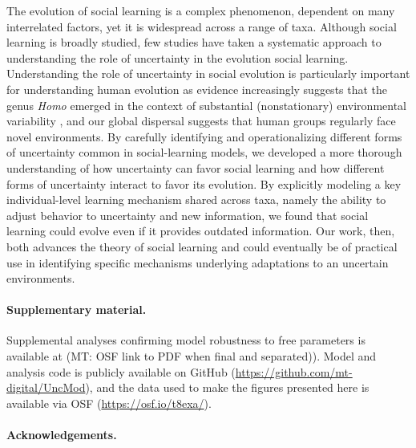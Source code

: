 \documentclass[letterpaper,11.5pt]{scrartcl}
\newcommand{\mt}[1]{{\textcolor{myorange} {({\tiny MT:} #1)}}}
\newcommand{\cm}[1]{{\textcolor{mypurple} {({\tiny CM:} #1)}}}
\begin{document}
The evolution of social learning is a complex phenomenon, dependent on many interrelated factors, yet it is widespread across a
range of taxa. Although social learning is broadly studied, few studies have taken a systematic approach to understanding the role
of uncertainty in the evolution social learning. Understanding the role of uncertainty in social evolution is particularly important
for understanding human evolution as evidence increasingly suggests that the genus \emph{Homo} emerged in the context of substantial
(nonstationary) environmental variability \citep{anton_etal2014, levin2015}, and our global dispersal suggests that human groups regularly face novel environments. By carefully identifying and operationalizing different forms of uncertainty common in social-learning models, we developed a more thorough understanding of how uncertainty can favor social learning and how different forms of uncertainty interact to favor its evolution. By explicitly modeling a key individual-level learning mechanism shared across taxa, namely the ability to adjust behavior to uncertainty and new information, we found that social learning could evolve even if it provides outdated information. %
Our work, then, both advances the theory of social learning and could eventually be of practical use in identifying specific mechanisms underlying adaptations to an uncertain environments.


\paragraph{Supplementary material.} Supplemental analyses confirming model robustness to free parameters is available at \mt{OSF link to PDF when final and separated)}. Model and analysis code is publicly available on GitHub (\url{https://github.com/mt-digital/UncMod}), and the data used to make the figures presented here is available via OSF (\url{https://osf.io/t8exa/}).

\paragraph{Acknowledgements.} %
% 
\end{document}
